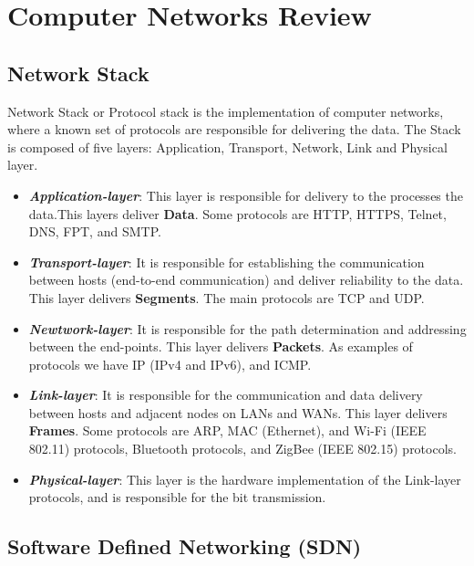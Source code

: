 \chapter{Computer Networks Review}
\label{ap:networks}

\section{Network Stack}

Network Stack\cite{kurose} or Protocol stack is the implementation of computer networks, where a known set of protocols are responsible for delivering the data.  The Stack is composed of five layers: Application, Transport, Network, Link and Physical layer.
\begin{itemize}
    \item \textit{\textbf{Application-layer}}: This layer is responsible for delivery to the processes the data.This layers deliver \textbf{Data}. Some protocols are HTTP, HTTPS, Telnet, DNS, FPT, and SMTP.
    \item \textit{\textbf{Transport-layer}}: It is responsible for establishing the communication between hosts (end-to-end communication) and deliver reliability to the data. This layer delivers \textbf{Segments}. The main protocols are TCP and UDP.
    \item \textit{\textbf{Newtwork-layer}}: It is responsible for the path determination and addressing between the end-points. This layer delivers \textbf{Packets}. As examples of protocols we have IP (IPv4 and IPv6), and ICMP. 
    \item \textit{\textbf{Link-layer}}: It is responsible for the communication and data delivery between hosts and adjacent nodes on LANs and WANs. This layer delivers \textbf{Frames}. Some protocols are \acrshort{ARP}, \acrshort{MAC} (Ethernet), and Wi-Fi (IEEE 802.11) protocols, Bluetooth protocols, and ZigBee (IEEE 802.15) protocols. 
    \item \textit{\textbf{Physical-layer}}: This layer is the hardware implementation of the Link-layer protocols, and is responsible for the bit transmission. 
\end{itemize}

\section{Software Defined Networking (SDN)}

